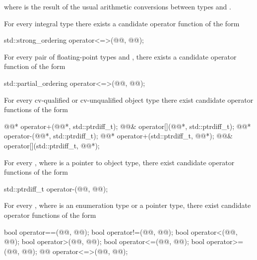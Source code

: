 where
is the result of the usual arithmetic conversions between types
and
.

\pnum
For every integral type 
there exists a candidate operator function of the form

\begin{codeblock}
std::strong_ordering operator<=>(@@, @@);
\end{codeblock}

\pnum
For every pair of floating-point types
 and ,
there exists a candidate operator function of the form

\begin{codeblock}
std::partial_ordering operator<=>(@@, @@);
\end{codeblock}

\pnum
For every cv-qualified or cv-unqualified object type
there exist candidate operator functions of the form

\begin{codeblock}
@@*      operator+(@@*, std::ptrdiff_t);
@@&      operator[](@@*, std::ptrdiff_t);
@@*      operator-(@@*, std::ptrdiff_t);
@@*      operator+(std::ptrdiff_t, @@*);
@@&      operator[](std::ptrdiff_t, @@*);
\end{codeblock}

\pnum
For every
,
where
is a pointer to object type,
there exist candidate operator functions of the form

\begin{codeblock}
std::ptrdiff_t   operator-(@@, @@);
\end{codeblock}

\pnum
For every , where  is an enumeration type or a pointer type,
there exist candidate operator functions of the form

\begin{codeblock}
bool    operator==(@@, @@);
bool    operator!=(@@, @@);
bool    operator<(@@, @@);
bool    operator>(@@, @@);
bool    operator<=(@@, @@);
bool    operator>=(@@, @@);
@@       operator<=>(@@, @@);
\end{codeblock}

